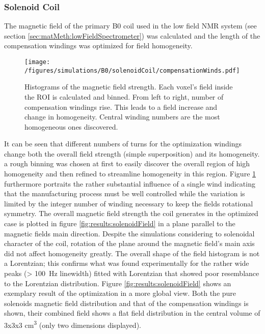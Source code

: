             \subsubsection{Solenoid Coil}
            \label{sec:results:B0solenoid}
            The magnetic field of the primary B0 coil used in the low field NMR system (see section \ref{sec:matMeth:lowFieldSpectrometer}) was calculated and the length of the compensation windings was optimized for field homogeneity.
                \begin{figure}
                    \centering
                    \texttt{[image: /figures/simulations/B0/solenoidCoil/compensationWinds.pdf]}
                    \caption[Compensation wind optimization]{Histograms of the magnetic field strength. Each voxel's field inside the ROI is calculated and binned. From left to right, number of compensation windings rise. This leads to a field increase and change in homogeneity. Central winding numbers are the most homogeneous ones discovered.}
                    \label{fig:results:compensationWindOptimization}
                \end{figure}
            It can be seen that different numbers of turns for the optimization windings change both the overall field strength (simple superposition) and its homogeneity. a rough binning was chosen at first to easily discover the overall region of high homogeneity and then refined to streamline homogeneity in this region.
            Figure \ref{fig:results:compensationWindOptimization} furthermore portraits the rather substantial influence of a single wind indicating that the manufacturing process must be well controlled while the variation is limited by the integer number of winding necessary to keep the fields rotational symmetry.
            The  overall magnetic field strength the coil generates in the optimized case is plotted in figure \ref{fig:results:solenoidField} in a plane parallel to the magnetic fields main direction. Despite the simulations considering to solenoidal character of the coil, rotation of the plane around the magnetic field's main axis did not affect homogeneity greatly. The overall shape of the field histogram is not a Lorentzian; this confirms what was found experimentally for the rather wide peaks (> \SI{100}{\hertz} linewidth) fitted with Lorentzian that showed poor resemblance to the Lorentzian distribution. Figure \ref{fig:results:solenoidField} shows an exemplary result of the optimization in a more global view. Both the pure solenoids magnetic field distribution and that of the compensation windings is shown, their combined field shows a flat field distribution in the central volume of 3x3x3 \si{\cm\cubed} (only two dimensions displayed).
